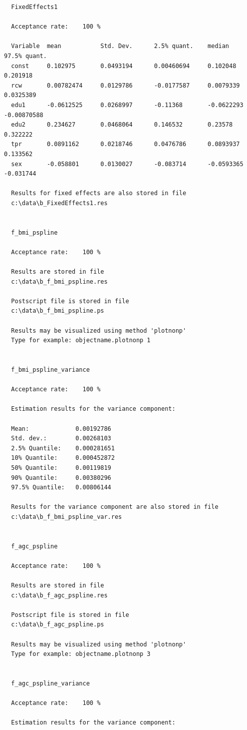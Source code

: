 \documentclass[11pt,a4paper,twoside]{bayesxreport}
\begin{document}
\begin{verbatim}
  FixedEffects1

  Acceptance rate:    100 %

  Variable  mean           Std. Dev.      2.5% quant.    median         97.5% quant.
  const     0.102975       0.0493194      0.00460694     0.102048       0.201918
  rcw       0.00782474     0.0129786      -0.0177587     0.0079339      0.0325389
  edu1      -0.0612525     0.0268997      -0.11368       -0.0622293     -0.00870588
  edu2      0.234627       0.0468064      0.146532       0.23578        0.322222
  tpr       0.0891162      0.0218746      0.0476786      0.0893937      0.133562
  sex       -0.058801      0.0130027      -0.083714      -0.0593365     -0.031744

  Results for fixed effects are also stored in file
  c:\data\b_FixedEffects1.res


  f_bmi_pspline

  Acceptance rate:    100 %

  Results are stored in file
  c:\data\b_f_bmi_pspline.res

  Postscript file is stored in file
  c:\data\b_f_bmi_pspline.ps

  Results may be visualized using method 'plotnonp'
  Type for example: objectname.plotnonp 1


  f_bmi_pspline_variance

  Acceptance rate:    100 %

  Estimation results for the variance component:

  Mean:             0.00192786
  Std. dev.:        0.00268103
  2.5% Quantile:    0.000281651
  10% Quantile:     0.000452872
  50% Quantile:     0.00119819
  90% Quantile:     0.00380296
  97.5% Quantile:   0.00806144

  Results for the variance component are also stored in file
  c:\data\b_f_bmi_pspline_var.res


  f_agc_pspline

  Acceptance rate:    100 %

  Results are stored in file
  c:\data\b_f_agc_pspline.res

  Postscript file is stored in file
  c:\data\b_f_agc_pspline.ps

  Results may be visualized using method 'plotnonp'
  Type for example: objectname.plotnonp 3


  f_agc_pspline_variance

  Acceptance rate:    100 %

  Estimation results for the variance component:


\end{verbatim}
\end{document}
